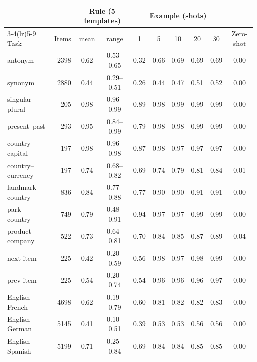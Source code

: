 \begin{tabular}{@{}lrcccccccc@{}}
\toprule
 & & \multicolumn{2}{c}{Rule (5 templates)} & \multicolumn{5}{c}{Example (shots)} & \\
\cmidrule(lr){3-4}\cmidrule(lr){5-9}
Task & Items & mean & range & 1 & 5 & 10 & 20 & 30 & Zero-shot \\
\midrule
antonym & 2398 & 0.62 & 0.53--0.65 & 0.32 & 0.66 & 0.69 & 0.69 & 0.69 & 0.00 \\
synonym & 2880 & 0.44 & 0.29--0.51 & 0.26 & 0.44 & 0.47 & 0.51 & 0.52 & 0.00 \\
singular--plural & 205 & 0.98 & 0.96--0.99 & 0.89 & 0.98 & 0.99 & 0.99 & 0.99 & 0.00 \\
present--past & 293 & 0.95 & 0.84--0.99 & 0.79 & 0.98 & 0.98 & 0.99 & 0.99 & 0.00 \\
country--capital & 197 & 0.98 & 0.96--0.98 & 0.87 & 0.98 & 0.97 & 0.97 & 0.97 & 0.00 \\
country--currency & 197 & 0.74 & 0.68--0.82 & 0.69 & 0.74 & 0.79 & 0.81 & 0.84 & 0.01 \\
landmark--country & 836 & 0.84 & 0.77--0.88 & 0.77 & 0.90 & 0.90 & 0.91 & 0.91 & 0.00 \\
park--country & 749 & 0.79 & 0.48--0.91 & 0.94 & 0.97 & 0.97 & 0.99 & 0.99 & 0.00 \\
product--company & 522 & 0.73 & 0.64--0.81 & 0.70 & 0.84 & 0.85 & 0.87 & 0.89 & 0.04 \\
next-item & 225 & 0.42 & 0.20--0.59 & 0.56 & 0.98 & 0.97 & 0.98 & 0.99 & 0.00 \\
prev-item & 225 & 0.54 & 0.20--0.74 & 0.54 & 0.96 & 0.96 & 0.96 & 0.97 & 0.00 \\
English--French & 4698 & 0.62 & 0.19--0.79 & 0.60 & 0.81 & 0.82 & 0.82 & 0.83 & 0.00 \\
English--German & 5145 & 0.41 & 0.10--0.51 & 0.39 & 0.53 & 0.53 & 0.56 & 0.56 & 0.00 \\
English--Spanish & 5199 & 0.71 & 0.25--0.84 & 0.69 & 0.84 & 0.84 & 0.85 & 0.85 & 0.00 \\
\bottomrule
\end{tabular}
